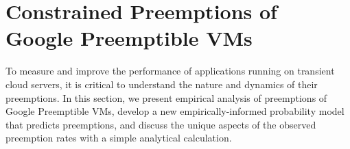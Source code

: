 \vspace*{\subsecspace}
\section{Constrained Preemptions of Google Preemptible VMs}
\label{sec:preemption-dynamics}



To measure and improve the performance of applications running on transient cloud servers, it is critical to understand the nature and dynamics of their preemptions. 
In this section, we present empirical analysis of preemptions of Google Preemptible VMs, develop a new empirically-informed probability model that predicts preemptions, and discuss the unique aspects of the observed preemption rates with a simple analytical calculation.  



